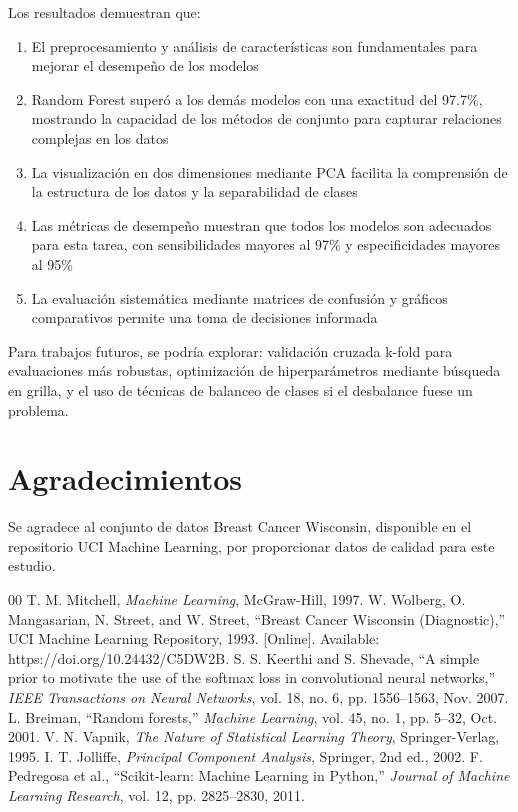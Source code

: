 \documentclass[conference]{IEEEtran}
\begin{document}
Los resultados demuestran que:
\begin{enumerate}
\item El preprocesamiento y análisis de características son fundamentales para mejorar el desempeño de los modelos
\item Random Forest superó a los demás modelos con una exactitud del 97.7\%, mostrando la capacidad de los métodos de conjunto para capturar relaciones complejas en los datos
\item La visualización en dos dimensiones mediante PCA facilita la comprensión de la estructura de los datos y la separabilidad de clases
\item Las métricas de desempeño muestran que todos los modelos son adecuados para esta tarea, con sensibilidades mayores al 97\% y especificidades mayores al 95\%
\item La evaluación sistemática mediante matrices de confusión y gráficos comparativos permite una toma de decisiones informada
\end{enumerate}

Para trabajos futuros, se podría explorar: validación cruzada k-fold para evaluaciones más robustas, optimización de hiperparámetros mediante búsqueda en grilla, y el uso de técnicas de balanceo de clases si el desbalance fuese un problema.

\section*{Agradecimientos}

Se agradece al conjunto de datos Breast Cancer Wisconsin, disponible en el repositorio UCI Machine Learning, por proporcionar datos de calidad para este estudio.

\begin{thebibliography}{00}
 T. M. Mitchell, \textit{Machine Learning}, McGraw-Hill, 1997.
 W. Wolberg, O. Mangasarian, N. Street, and W. Street, ``Breast Cancer Wisconsin (Diagnostic),'' UCI Machine Learning Repository, 1993. [Online]. Available: https://doi.org/10.24432/C5DW2B.
 S. S. Keerthi and S. Shevade, ``A simple prior to motivate the use of the softmax loss in convolutional neural networks,'' \textit{IEEE Transactions on Neural Networks}, vol. 18, no. 6, pp. 1556--1563, Nov. 2007.
 L. Breiman, ``Random forests,'' \textit{Machine Learning}, vol. 45, no. 1, pp. 5--32, Oct. 2001.
 V. N. Vapnik, \textit{The Nature of Statistical Learning Theory}, Springer-Verlag, 1995.
 I. T. Jolliffe, \textit{Principal Component Analysis}, Springer, 2nd ed., 2002.
 F. Pedregosa et al., ``Scikit-learn: Machine Learning in Python,'' \textit{Journal of Machine Learning Research}, vol. 12, pp. 2825--2830, 2011.
\end{thebibliography}
\end{document}
